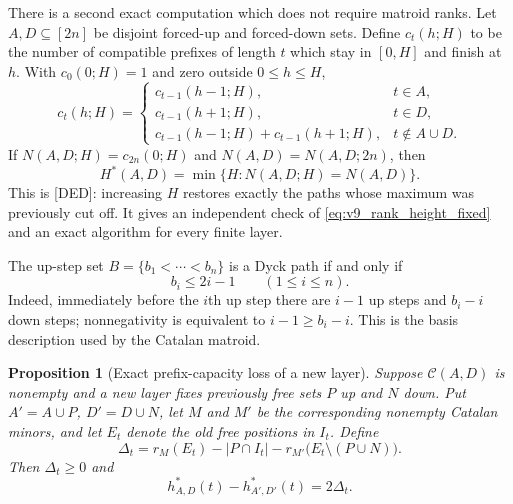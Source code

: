\documentclass[11pt]{amsart}
\numberwithin{equation}{section}
\theoremstyle{plain}
\newtheorem{proposition}[theorem]{Proposition}
\theoremstyle{definition}
\theoremstyle{remark}
\begin{document}
There is a second exact computation which does not require matroid ranks.  Let
$A,D\subseteq[2n]$ be disjoint forced-up and forced-down sets.  Define
$c_t(h;H)$ to be the number of compatible prefixes of length $t$ which stay in
$[0,H]$ and finish at $h$.  With $c_0(0;H)=1$ and zero outside $0\le h\le H$,
\begin{equation}
c_t(h;H)=
\begin{cases}
c_{t-1}(h-1;H),&t\in A,\\
c_{t-1}(h+1;H),&t\in D,\\
c_{t-1}(h-1;H)+c_{t-1}(h+1;H),&t\notin A\cup D.
\end{cases}
\label{eq:v9_bounded_catalan_dp}
\end{equation}
If $N(A,D;H)=c_{2n}(0;H)$ and
$N(A,D)=N(A,D;2n)$, then
\begin{equation}
\boxed{H^*(A,D)=\min\{H:N(A,D;H)=N(A,D)\}.}
\label{eq:v9_bounded_dp_height}
\end{equation}
This is \textup{[DED]}: increasing $H$ restores exactly the paths whose maximum
was previously cut off.  It gives an independent check of
\eqref{eq:v9_rank_height_fixed} and an exact algorithm for every finite layer.

The up-step set $B=\{b_1<\cdots<b_n\}$ is a Dyck path if and only if
\begin{equation}
b_i\le 2i-1\qquad(1\le i\le n).
\label{eq:v9_catalan_basis_criterion}
\end{equation}
Indeed, immediately before the $i$th up step there are $i-1$ up steps and
$b_i-i$ down steps; nonnegativity is equivalent to $i-1\ge b_i-i$.
This is the basis description used by the Catalan matroid.

\begin{proposition}[Exact prefix-capacity loss of a new layer]
\label{prop:v9_layer_deficit}
Suppose $\mathcal C(A,D)$ is nonempty and a new layer fixes previously free
sets $P$ up and $N$ down.  Put $A'=A\cup P$, $D'=D\cup N$, let $M$ and $M'$ be
the corresponding nonempty Catalan minors, and let $E_t$ denote the old free
positions in $I_t$.  Define
\begin{equation}
\Delta_t=r_M(E_t)-|P\cap I_t|
-r_{M'}\bigl(E_t\setminus(P\cup N)\bigr).
\label{eq:v9_layer_deficit}
\end{equation}
Then $\Delta_t\ge0$ and
\begin{equation}
\boxed{h^*_{A,D}(t)-h^*_{A',D'}(t)=2\Delta_t.}
\label{eq:v9_exact_layer_drop}
\end{equation}
\end{proposition}
\end{document}
